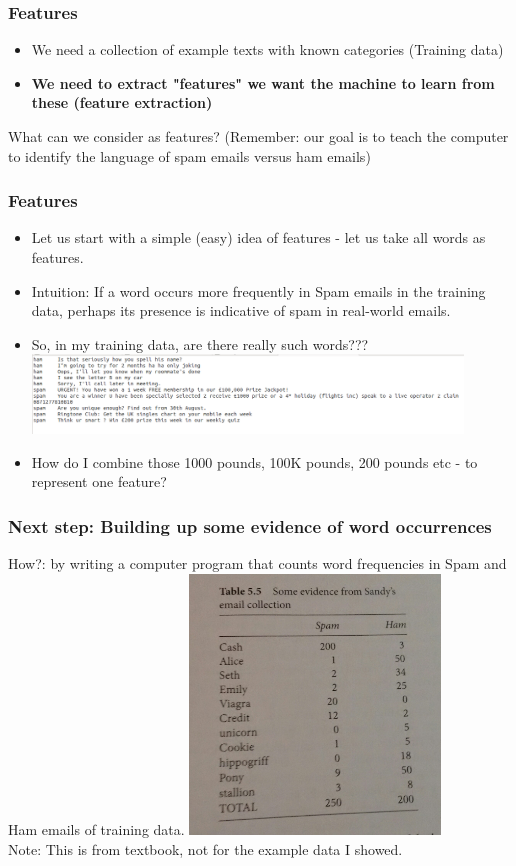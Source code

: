 \documentclass{beamer}
\begin{document}
\begin{frame}
\frametitle{Features}
\begin{itemize}
\item We need a collection of example texts with known categories (Training data)
\item \textbf{We need to extract "features" we want the machine to learn from these (feature extraction)}
\end{itemize}
What can we consider as features?
(Remember: our goal is to teach the computer to identify the language of spam emails versus ham emails)
\end{frame}

\begin{frame}
\frametitle{Features}
\begin{itemize}
\item Let us start with a simple (easy) idea of features - let us take all words as features.
\item Intuition: If a word occurs more frequently in Spam emails in the training data, perhaps its presence is indicative of spam in real-world emails.
\item So, in my training data, are there really such words???
\includegraphics[width=0.9\textwidth]{ham-spam-example.png} \pause
\item How do I combine those 1000 pounds, 100K pounds, 200 pounds etc - to represent one feature? 
\end{itemize}
\end{frame}

\begin{frame}
\frametitle{Next step: Building up some evidence of word occurrences}
How?: by writing a computer program that counts word frequencies in Spam and Ham emails of training data.
\includegraphics[width=0.5\textwidth]{spam-frequencies.jpg}
\\ Note: This is from textbook, not for the example data I showed. 
\end{frame}
\end{document}
